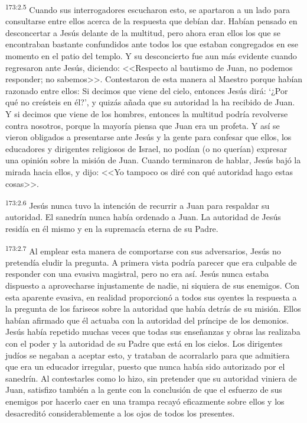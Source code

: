 \par 
\textsuperscript{173:2.5} Cuando sus interrogadores escucharon esto, se apartaron a un lado para consultarse entre ellos acerca de la respuesta que debían dar. Habían pensado en desconcertar a Jesús delante de la multitud, pero ahora eran ellos los que se encontraban bastante confundidos ante todos los que estaban congregados en ese momento en el patio del templo. Y su desconcierto fue aun más evidente cuando regresaron ante Jesús, diciendo: <<Respecto al bautismo de Juan, no podemos responder; no sabemos>>. Contestaron de esta manera al Maestro porque habían razonado entre ellos: Si decimos que viene del cielo, entonces Jesús dirá: `¿Por qué no creísteis en él?', y quizás añada que su autoridad la ha recibido de Juan. Y si decimos que viene de los hombres, entonces la multitud podría revolverse contra nosotros, porque la mayoría piensa que Juan era un profeta. Y así se vieron obligados a presentarse ante Jesús y la gente para confesar que ellos, los educadores y dirigentes religiosos de Israel, no podían (o no querían) expresar una opinión sobre la misión de Juan. Cuando terminaron de hablar, Jesús bajó la mirada hacia ellos, y dijo: <<Yo tampoco os diré con qué autoridad hago estas cosas>>.

\par 
\textsuperscript{173:2.6} Jesús nunca tuvo la intención de recurrir a Juan para respaldar su autoridad. El sanedrín nunca había ordenado a Juan. La autoridad de Jesús residía en él mismo y en la supremacía eterna de su Padre.

\par 
\textsuperscript{173:2.7} Al emplear esta manera de comportarse con sus adversarios, Jesús no pretendía eludir la pregunta. A primera vista podría parecer que era culpable de responder con una evasiva magistral, pero no era así. Jesús nunca estaba dispuesto a aprovecharse injustamente de nadie, ni siquiera de sus enemigos. Con esta aparente evasiva, en realidad proporcionó a todos sus oyentes la respuesta a la pregunta de los fariseos sobre la autoridad que había detrás de su misión. Ellos habían afirmado que él actuaba con la autoridad del príncipe de los demonios. Jesús había repetido muchas veces que todas sus enseñanzas y obras las realizaba con el poder y la autoridad de su Padre que está en los cielos. Los dirigentes judíos se negaban a aceptar esto, y trataban de acorralarlo para que admitiera que era un educador irregular, puesto que nunca había sido autorizado por el sanedrín. Al contestarles como lo hizo, sin pretender que su autoridad viniera de Juan, satisfizo también a la gente con la conclusión de que el esfuerzo de sus enemigos por hacerlo caer en una trampa recayó eficazmente sobre ellos y los desacreditó considerablemente a los ojos de todos los presentes.


